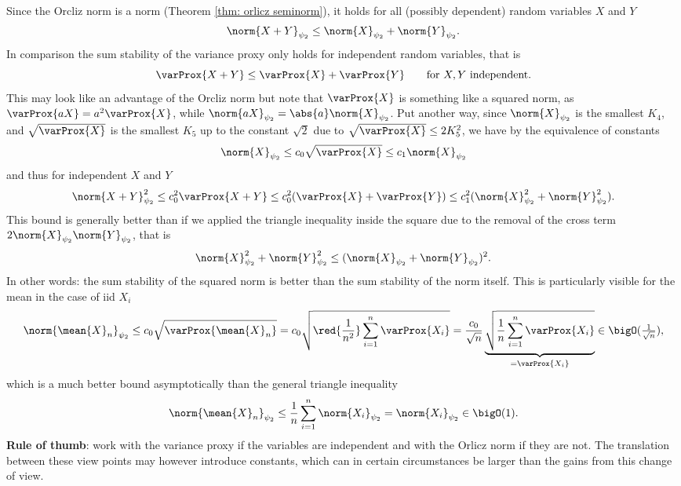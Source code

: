 \begin{remark}
    Since the Orcliz norm is a norm
    (Theorem \ref{thm: orlicz seminorm}), it holds for all (possibly dependent)
    random variables \(X\) and \(Y\)
    \[
        \norm{X+Y}_{\psi_2} \le \norm{X}_{\psi_2} + \norm{Y}_{\psi_2}.
    \]
    In comparison the sum stability of the variance proxy only holds for
    independent random variables, that is
    \[
        \varProx{X+Y} \le \varProx{X} + \varProx{Y}
        \qquad \text{for } X, Y \text{ independent}.
    \]
    This may look like an advantage of the Orcliz norm but note that \(\varProx{X}\)
    is something like a squared norm, as \(\varProx{aX} = a^2 \varProx{X}\),
    while \(\norm{aX}_{\psi_2} = \abs{a} \norm{X}_{\psi_2}\).
    Put another way, since \(\norm{X}_{\psi_2}\) is the smallest \(K_4\),
    and \(\sqrt{\varProx{X}}\) is the smallest \(K_5\) up to the constant
    \(\sqrt{2}\) due to \(\sqrt{\varProx{X}}\le 2K_5^2\), we have by
    the equivalence of constants
    \[
        \norm{X}_{\psi_2} \le c_0 \sqrt{\varProx{X}} \le c_1 \norm{X}_{\psi_2}
    \]
    and thus for independent \(X\) and \(Y\)
    \[
        \norm{X + Y}_{\psi_2}^2 \le c_0^2 \varProx{X+Y} \le c_0^2 (\varProx{X} + \varProx{Y})
        \le c_1^2 (\norm{X}_{\psi_2}^2 + \norm{Y}_{\psi_2}^2).
    \]
    This bound is generally better than if we applied the triangle inequality inside
    the square due to the removal of the cross term
    \(2\norm{X}_{\psi_2}\norm{Y}_{\psi_2}\), that is
    \[
        \norm{X}_{\psi_2}^2 + \norm{Y}_{\psi_2}^2 \le (\norm{X}_{\psi_2} + \norm{Y}_{\psi_2})^2.
    \]
    In other words: the sum stability of the squared norm is better than the sum
    stability of the norm itself. This is particularly visible for the mean in
    the case of iid \(X_i\)
    \[
        \norm{\mean{X}_n}_{\psi_2} \le c_0 \sqrt{\varProx{\mean{X}_n}}
        = c_0 \sqrt{\red{\frac1{n^2}} \sum_{i=1}^n \varProx{X_i}}
        =  \frac{c_0}{\sqrt{n}} \underbrace{\sqrt{\frac1n \sum_{i=1}^n \varProx{X_i}}}_{= \varProx{X_i}}
        \in \bigO(\tfrac1{\sqrt{n}}),
    \]
    which is a much better bound asymptotically than the general triangle inequality
    \[
        \norm{\mean{X}_n}_{\psi_2} \le \frac1n \sum_{i=1}^n \norm{X_i}_{\psi_2} = \norm{X_i}_{\psi_2} \in \bigO(1).
    \]
    \textbf{Rule of thumb}: work with the variance proxy if the variables are independent
    and with the Orlicz norm if they are not. The translation between
    these view points may however introduce constants, which can in certain
    circumstances be larger than the gains from this change of view.
\end{remark}


